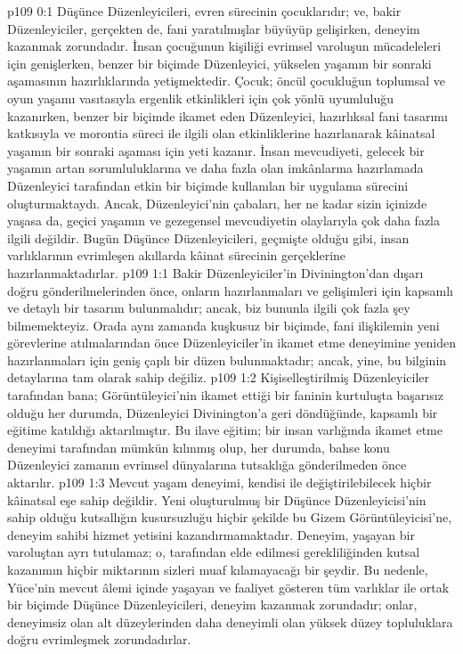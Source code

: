 \vs p109 0:1 Düşünce Düzenleyicileri, evren sürecinin çocuklarıdır; ve, bakir Düzenleyiciler, gerçekten de, fani yaratılmışlar büyüyüp gelişirken, deneyim kazanmak zorundadır. İnsan çocuğunun kişiliği evrimsel varoluşun mücadeleleri için genişlerken, benzer bir biçimde Düzenleyici, yükselen yaşamın bir sonraki aşamasının hazırlıklarında yetişmektedir. Çocuk; öncül çocukluğun toplumsal ve oyun yaşamı vasıtasıyla ergenlik etkinlikleri için çok yönlü uyumluluğu kazanırken, benzer bir biçimde ikamet eden Düzenleyici, hazırlıksal fani tasarımı katkısıyla ve morontia süreci ile ilgili olan etkinliklerine hazırlanarak kâinatsal yaşamın bir sonraki aşaması için yeti kazanır. İnsan mevcudiyeti, gelecek bir yaşamın artan sorumluluklarına ve daha fazla olan imkânlarına hazırlamada Düzenleyici tarafından etkin bir biçimde kullanılan bir uygulama sürecini oluşturmaktaydı. Ancak, Düzenleyici’nin çabaları, her ne kadar sizin içinizde yaşasa da, geçici yaşamın ve gezegensel mevcudiyetin olaylarıyla çok daha fazla ilgili değildir. Bugün Düşünce Düzenleyicileri, geçmişte olduğu gibi, insan varlıklarının evrimleşen akıllarda kâinat sürecinin gerçeklerine hazırlanmaktadırlar.
\vs p109 1:1 Bakir Düzenleyiciler’in Divinington’dan dışarı doğru gönderilmelerinden önce, onların hazırlanmaları ve gelişimleri için kapsamlı ve detaylı bir tasarım bulunmalıdır; ancak, biz bununla ilgili çok fazla şey bilmemekteyiz. Orada aynı zamanda kuşkusuz bir biçimde, fani ilişkilemin yeni görevlerine atılmalarından önce Düzenleyiciler’in ikamet etme deneyimine yeniden hazırlanmaları için geniş çaplı bir düzen bulunmaktadır; ancak, yine, bu bilginin detaylarına tam olarak sahip değiliz.
\vs p109 1:2 Kişiselleştirilmiş Düzenleyiciler tarafından bana; Görüntüleyici’nin ikamet ettiği bir faninin kurtuluşta başarısız olduğu her durumda, Düzenleyici Divinington’a geri döndüğünde, kapsamlı bir eğitime katıldığı aktarılmıştır. Bu ilave eğitim; bir insan varlığında ikamet etme deneyimi tarafından mümkün kılınmış olup, her durumda, bahse konu Düzenleyici zamanın evrimsel dünyalarına tutsaklığa gönderilmeden önce aktarılır.
\vs p109 1:3 Mevcut yaşam deneyimi, kendisi ile değiştirilebilecek hiçbir kâinatsal eşe sahip değildir. Yeni oluşturulmuş bir Düşünce Düzenleyicisi’nin sahip olduğu kutsallığın kusursuzluğu hiçbir şekilde bu Gizem Görüntüleyicisi’ne, deneyim sahibi hizmet yetisini kazandırmamaktadır. Deneyim, yaşayan bir varoluştan ayrı tutulamaz; o,  tarafından elde edilmesi gerekliliğinden kutsal kazanımın hiçbir miktarının sizleri muaf kılamayacağı bir şeydir. Bu nedenle, Yüce’nin mevcut âlemi içinde yaşayan ve faaliyet gösteren tüm varlıklar ile ortak bir biçimde Düşünce Düzenleyicileri, deneyim kazanmak zorundadır; onlar, deneyimsiz olan alt düzeylerinden daha deneyimli olan yüksek düzey topluluklara doğru evrimleşmek zorundadırlar.
